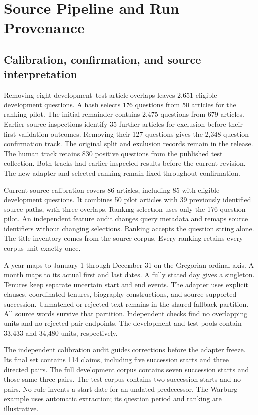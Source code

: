 \section{Source Pipeline and Run Provenance}
\label{app:pipeline}

\subsection{Calibration, confirmation, and source interpretation}
Removing eight development--test article overlaps leaves 2,651 eligible development questions.
A hash selects 176 questions from 50 articles for the ranking pilot.
The initial remainder contains 2,475 questions from 679 articles.
Earlier source inspections identify 35 further articles for exclusion before their first validation outcomes.
Removing their 127 questions gives the 2,348-question confirmation track.
The original split and exclusion records remain in the release.
The human track retains 830 positive questions from the published test collection.
Both tracks had earlier inspected results before the current revision.
The new adapter and selected ranking remain fixed throughout confirmation.

Current source calibration covers 86 articles, including 85 with eligible development questions.
It combines 50 pilot articles with 39 previously identified source paths, with three overlaps.
Ranking selection uses only the 176-question pilot.
An independent feature audit changes query metadata and remaps source identifiers without changing selections.
Ranking accepts the question string alone.
The title inventory comes from the source corpus.
Every ranking retains every corpus unit exactly once.

A year maps to January 1 through December 31 on the Gregorian ordinal axis.
A month maps to its actual first and last dates.
A fully stated day gives a singleton.
Tenures keep separate uncertain start and end events.
The adapter uses explicit clauses, coordinated tenures, biography constructions, and source-supported succession.
Unmatched or rejected text remains in the shared fallback partition.
All source words survive that partition.
Independent checks find no overlapping units and no rejected pair endpoints.
The development and test pools contain 33,433 and 34,480 units, respectively.

The independent calibration audit guides corrections before the adapter freeze.
Its final set contains 114 claims, including five succession starts and three directed pairs.
The full development corpus contains seven succession starts and those same three pairs.
The test corpus contains two succession starts and no pairs.
No rule invents a start date for an undated predecessor.
The Warburg example uses automatic extraction; its question period and ranking are illustrative.

